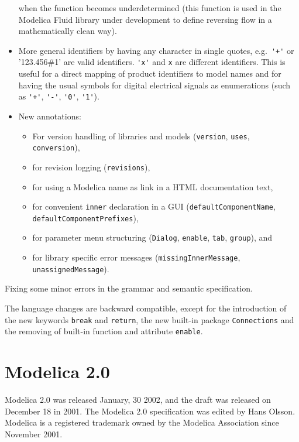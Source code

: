 \begin{itemize}
  when the function becomes underdetermined (this function is used in
  the Modelica Fluid library under development to define reversing flow
  in a mathematically clean way).
\item
  More general identifiers by having any character in single quotes,
  e.g.\ \lstinline!'+'! or '123.456\#1' are valid identifiers. \lstinline!'x'! and \lstinline!x! are
  different identifiers. This is useful for a direct mapping of product
  identifiers to model names and for having the usual symbols for
  digital electrical signals as enumerations (such as \lstinline!'+'!, \lstinline!'-'!, \lstinline!'0'!,
  \lstinline!'1'!).
\item
  New annotations:
\begin{itemize}
\item For version handling of libraries and models (\lstinline!version!, \lstinline!uses!,
\lstinline!conversion!),
\item for revision logging (\lstinline!revisions!),
\item for using a Modelica name as link in a HTML documentation text,
\item for convenient \lstinline!inner! declaration in a GUI (\lstinline!defaultComponentName!,
\lstinline!defaultComponentPrefixes!),
\item for parameter menu structuring (\lstinline!Dialog!, \lstinline!enable!, \lstinline!tab!,
\lstinline!group!), and
\item for library specific error messages (\lstinline!missingInnerMessage!,
\lstinline!unassignedMessage!).
\end{itemize}
\end{itemize}
Fixing some minor errors in the grammar and semantic specification.

The language changes are backward compatible, except for the introduction of the new keywords \lstinline!break! and \lstinline!return!, the new built-in package \lstinline!Connections! and the removing of built-in function and attribute \lstinline!enable!.

\section{Modelica 2.0}\label{modelica-2-0}

Modelica 2.0 was released January, 30 2002, and the draft was released
on December 18 in 2001. The Modelica 2.0 specification was edited by
Hans Olsson. Modelica is a registered trademark owned by the Modelica
Association since November 2001.


